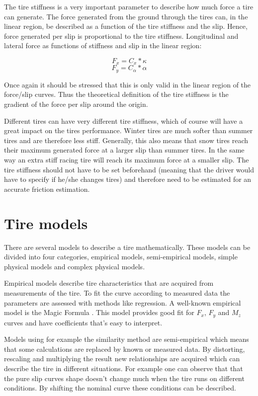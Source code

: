 The tire stiffness is a very important parameter to describe how much force a tire can generate. The  force generated from the ground through the tires can, in the linear region, be described as a function of the tire stiffness and the slip. Hence, force generated per slip is proportional to the tire stiffness. Longitudinal and lateral force as functions of stiffness and slip in the linear region:

\begin{equation}
F_{x} = C_{x}*\kappa
\end{equation}
\begin{equation}
F_{y} = C_{\alpha}*\alpha
\end{equation}

Once again it should be stressed that this is only valid in the linear region of the force/slip curves. Thus the theoretical definition of the tire stiffness is the gradient of the force per slip around the origin. 

Different tires can have very different tire stiffness, which of course will have a great impact on the tires performance. Winter tires are much softer than summer tires and are therefore less stiff. Generally, this also means that snow tires reach their maximum generated force at a larger slip than summer tires. In the same way an extra stiff racing tire will reach its maximum force at a smaller slip. The tire stiffness should not have to be set beforehand (meaning that the driver would have to specify if he/she changes tires) and therefore need to be estimated for an accurate friction estimation.


\section{Tire models}
\label{sec:tire_models}
There are several models to describe a tire mathematically. These models can be divided into four categories, empirical models, semi-empirical models, simple physical models and complex physical  models. 

Empirical models describe tire characteristics that are acquired from measurements of the tire. To fit the curve according to measured data the parameters are assessed with methods like regression. A well-known empirical model is the Magic Formula \cite{pacejka}. This model provides good fit for $F_{x}$, $F_{y}$ and $M_{z}$ curves and have coefficients that's easy to interpret.

Models using for example the similarity method are semi-empirical which means that some calculations are replaced by known or measured data. By distorting, rescaling and multiplying the result new relationships are acquired which can describe the tire in different situations. For example one can observe that that the pure slip curves shape doesn't change much \cite{pacejka} when the tire runs on different conditions. By shifting the nominal curve these conditions can be described.

